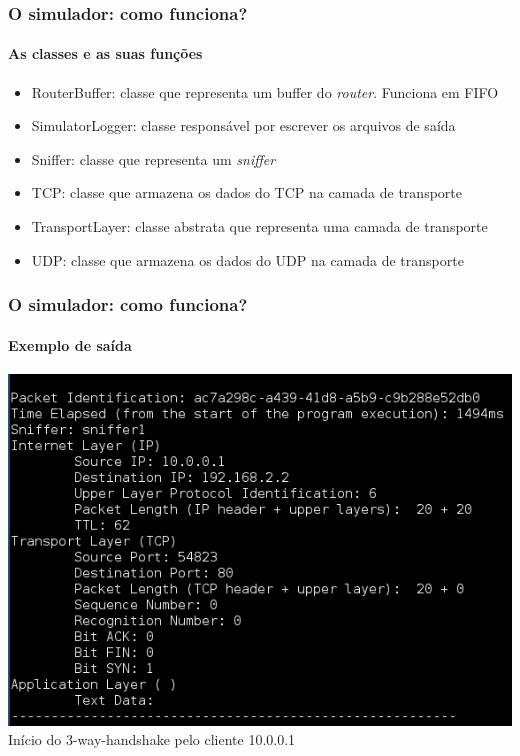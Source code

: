 \documentclass{beamer}
\begin{document}
\begin{frame}
	\frametitle{O simulador: como funciona?}
	\framesubtitle{As classes e as suas funções}
	\begin{itemize}
		\item RouterBuffer: classe que representa um buffer do \textit{router}. Funciona em FIFO
		\item SimulatorLogger: classe responsável por escrever os arquivos de saída
		\item Sniffer: classe que representa um \textit{sniffer}
		\item TCP: classe que armazena os dados do TCP na camada de transporte
		\item TransportLayer: classe abstrata que representa uma camada de transporte
		\item UDP: classe que armazena os dados do UDP na camada de transporte
	\end{itemize}
\end{frame}

\begin{frame}
	\frametitle{O simulador: como funciona?}
	\framesubtitle{Exemplo de saída}
	\begin{center}
		\includegraphics[scale=0.35]{printscreen1.png}\\
		Início do 3-way-handshake pelo cliente 10.0.0.1
	\end{center}
\end{frame}
\end{document}
